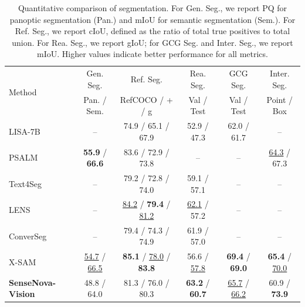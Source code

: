 \begin{table}[t]
    \centering
    \small
    \setlength{\tabcolsep}{6pt}
    \begin{tabular}{l|ccccc}
        \toprule
        \multirow{2}{*}{Method} & Gen. Seg. & Ref. Seg. & Rea. Seg. & GCG Seg. & Inter. Seg. \\
        & Pan. / Sem. & RefCOCO / + / g & Val / Test & Val / Test & Point / Box \\
        \midrule
        LISA-7B~\cite{lisa}               & --                                  & 74.9 / 65.1 / 67.9                                  & 52.9 / 47.3             & 62.0 / 61.7                         & --                               \\
        PSALM~\cite{zhang2024psalm}       & \textbf{55.9} / \textbf{66.6}       & 83.6 / 72.9 / 73.8                                  & --                      & --                                  & \underline{64.3} / 67.3          \\
        Text4Seg~\cite{lan2025text4seg}   & --                                  & 79.2 / 72.8 / 74.0                                  & 59.1 / 57.1             & --                                  & --                               \\
        LENS~\cite{zhu2026lens}           & --                                  & \underline{84.2} / \textbf{79.4} / \underline{81.2} & \underline{62.1} / 57.2 & --                                  & --                               \\
        ConverSeg~\cite{conversational}   & --                                  & 79.4 / 74.3 / 74.9                                  & 61.9 / 57.0             & --                                  & --                               \\
        X-SAM~\cite{xsam}                 & \underline{54.7} / \underline{66.5} & \textbf{85.1} / \underline{78.0} / \textbf{83.8}    & 56.6 / \underline{57.8} & \textbf{69.4} / \textbf{69.0}       & \textbf{65.4} / \underline{70.0} \\
        \textbf{SenseNova-Vision}           & 48.8 / 64.0                         & 81.3 / 76.0 / 80.3                                  & \textbf{63.2} / \textbf{60.7}    & \underline{65.7} / \underline{66.2} & 60.9 / \textbf{73.9}             \\
        \bottomrule
    \end{tabular}
    \caption{
        Quantitative comparison of segmentation.
        For Gen. Seg., we report PQ for panoptic segmentation (Pan.) and mIoU for semantic segmentation (Sem.).
        For Ref. Seg., we report cIoU, defined as the ratio of total true positives to total union.
        For Rea. Seg., we report gIoU; for GCG Seg. and Inter. Seg., we report mIoU.
        Higher values indicate better performance for all metrics.
    }
    \label{tab:segmentation-results}
\end{table}

